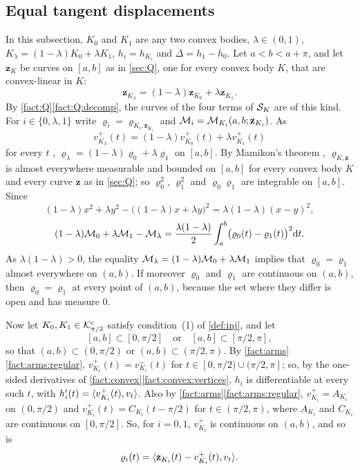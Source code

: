 \subsection{Equal tangent displacements}

In this subsection, $K_0$ and $K_1$ are any two convex bodies,
$\lambda\in(0,1)$, $K_\lambda=(1-\lambda)K_0+\lambda K_1$, $h_i=h_{K_i}$ and
$\Delta=h_1-h_0$. Let $a<b<a+\pi$, and let $\mathbf z_K$ be curves on $[a,b]$ as
in \cref{sec:Q}, one for every convex body $K$, that are convex-linear in $K$:
\[
  \mathbf z_{K_\lambda}=(1-\lambda)\mathbf z_{K_0}+\lambda\mathbf z_{K_1}.
\]
By \cref{fact:Q}\ref{fact:Q:decomp}, the curves of the four terms of $\mathcal{S}_K$
are of this kind. For $i\in\{0,\lambda,1\}$ write
$\varrho_i=\varrho_{K_i,\mathbf z_{K_i}}$ and
$\mathcal{M}_i=\mathcal{M}_{K_i}(a,b;\mathbf z_{K_i})$. As
\[
  v^+_{K_\lambda}(t)=(1-\lambda)v^+_{K_0}(t)+\lambda v^+_{K_1}(t)
\]
for every $t$ ,
$\varrho_\lambda=(1-\lambda)\varrho_0+\lambda\varrho_1$ on $[a,b]$. By
Mamikon's theorem , $\varrho_{K,\mathbf z}$ is almost
everywhere measurable and bounded on $[a,b]$ for every convex body $K$ and
every curve $\mathbf z$ as in \cref{sec:Q}; so $\varrho_0^2$, $\varrho_1^2$ and
$\varrho_0\varrho_1$ are integrable on $[a,b]$. Since
\[
  (1-\lambda)x^2+\lambda y^2-\bigl((1-\lambda)x+\lambda y\bigr)^2
  =\lambda(1-\lambda)(x-y)^2,
\]
\begin{equation}\label{eq:gap}
  (1-\lambda)\mathcal{M}_0+\lambda\mathcal{M}_1-\mathcal{M}_\lambda
    =\frac{\lambda(1-\lambda)}2\int_a^b\bigl(\varrho_0(t)
    -\varrho_1(t)\bigr)^2\mathrm{d} t .
\end{equation}
As $\lambda(1-\lambda)>0$, the equality
$\mathcal{M}_\lambda=(1-\lambda)\mathcal{M}_0+\lambda\mathcal{M}_1$ implies that $\varrho_0=\varrho_1$
almost everywhere on $(a,b)$. If moreover $\varrho_0$ and $\varrho_1$ are
continuous on $(a,b)$, then $\varrho_0=\varrho_1$ at every point of $(a,b)$,
because the set where they differ is open and has measure $0$.

Now let $K_0,K_1\in\mathcal{K}^{\mathrm{c}}_{\pi/2}$ satisfy condition~(1) of \cref{def:inj}, and let
\[
  [a,b]\subset[0,\pi/2]\quad\text{or}\quad[a,b]\subset[\pi/2,\pi],
\]
so that $(a,b)\subset(0,\pi/2)$ or $(a,b)\subset(\pi/2,\pi)$. By
\cref{fact:arms}\ref{fact:arms:regular}, $v^+_{K_i}(t)=v^-_{K_i}(t)$ for
$t\in[0,\pi/2)\cup(\pi/2,\pi]$; so, by the one-sided derivatives of
\cref{fact:convex}\ref{fact:convex:vertices}, $h_i$ is differentiable at every
such $t$, with $h_i'(t)=\langle v^+_{K_i}(t),v_t\rangle$. Also by
\cref{fact:arms}\ref{fact:arms:regular}, $v^+_{K_i}=A_{K_i}$ on $(0,\pi/2)$ and
$v^+_{K_i}(t)=C_{K_i}(t-\pi/2)$ for $t\in(\pi/2,\pi)$, where $A_{K_i}$ and
$C_{K_i}$ are continuous on $[0,\pi/2]$. So, for $i=0,1$, $v^+_{K_i}$ is
continuous on $(a,b)$, and so is
\[
  \varrho_i(t)=\langle \mathbf z_{K_i}(t)-v^+_{K_i}(t),v_t\rangle.
\]

